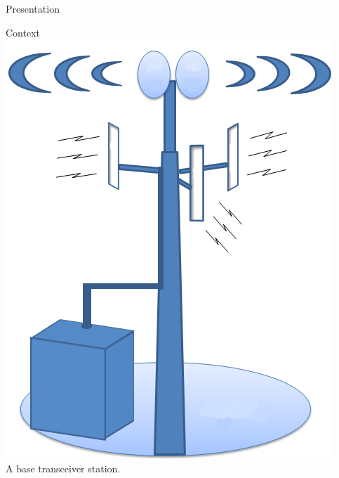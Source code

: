 \documentclass[10 pt]{beamer}
\begin{document}
\begin{section}{Presentation}

\begin{frame}{Context}
  \centering
  \includegraphics[scale=0.2]{bts.png}\\
  A base transceiver station.

\end{frame}


\end{section}
\end{document}
